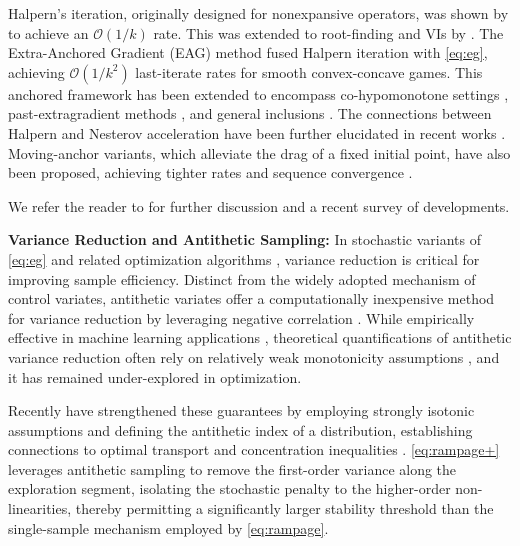 \documentclass[letter,11pt]{article}
\begin{document}
Halpern's iteration, originally designed for nonexpansive operators, was shown by \cite{lieder2021convergence} to achieve an $\mathcal{O}(1/k)$ rate. This was extended to root-finding and VIs by \cite{diakonikolas2020halpern}. The Extra-Anchored Gradient (EAG) method \cite{yoon2021accelerated} fused Halpern iteration with \eqref{eq:eg}, achieving $\mathcal{O}(1/k^2)$ last-iterate rates for smooth convex-concave games. This anchored framework has been extended to encompass co-hypomonotone settings \cite{lee2021fast}, past-extragradient methods \cite{tran2021halpern,cai2022baccelerated}, and general inclusions \cite{cai2022accelerated,tran2023extragradient}. The connections between Halpern and Nesterov acceleration have been further elucidated in recent works \cite{tran2022connection,partkryu2022}. Moving-anchor variants, which alleviate the drag of a fixed initial point, have also been proposed, achieving tighter rates and sequence convergence \cite{alcala2023moving,yuan2024symplectic,lu2024restarted}.

We refer the reader to \cite{tran2023sublinear,tran2024revisiting,tran2025accelerated} for further discussion and a recent survey of developments.

\noindent\textbf{Variance Reduction and Antithetic Sampling:}
In stochastic variants of \eqref{eq:eg} and related optimization algorithms \cite{JohnsonZhang2013a,DefazioBach2014,GowerSchmidt2020,chen2021communication,das2022faster}, variance reduction is critical for improving sample efficiency. Distinct from the widely adopted mechanism of control variates, antithetic variates \cite{HammersleyMorton1956a,KahnMarshall1953,RubinsteinKroese2017} offer a computationally inexpensive method for variance reduction by leveraging negative correlation \cite{HammersleyMauldon1956,Whitt1976}. While empirically effective in machine learning applications \cite{WuGoodman2019,RenZhao2019,DoucetWang2005}, theoretical quantifications of antithetic variance reduction often rely on relatively weak monotonicity assumptions \cite{RubinsteinKroese2017}, and it has remained under-explored in optimization. 

Recently \cite{HashemiLeeMakur2025,hashemi2025strong} have strengthened these guarantees by employing strongly isotonic assumptions and defining the antithetic index of a distribution, establishing connections to optimal transport \cite{AmbrosioBrueSemola2021,PanaretosZemel2019} and concentration inequalities \cite{BoucheronLugosiMassart2013}. \eqref{eq:rampage+} leverages antithetic sampling to remove the first-order variance along the exploration segment, isolating the stochastic penalty to the higher-order non-linearities, thereby permitting a significantly larger stability threshold than the single-sample mechanism employed by \eqref{eq:rampage}.
\end{document}
